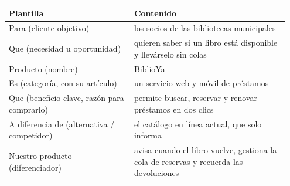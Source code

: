 {\small
\begin{longtable}{@{}>{\raggedright\arraybackslash}p{0.421\linewidth}>{\raggedright\arraybackslash}p{0.528\linewidth}@{}}
\toprule
\textbf{Plantilla} & \textbf{Contenido} \\
\midrule
\endhead
Para (cliente objetivo) & los socios de las bibliotecas municipales \\
Que (necesidad u oportunidad) & quieren saber si un libro está disponible y llevárselo sin colas \\
Producto (nombre) & BiblioYa \\
Es (categoría, con su artículo) & un servicio web y móvil de préstamos \\
Que (beneficio clave, razón para comprarlo) & permite buscar, reservar y renovar préstamos en dos clics \\
A diferencia de (alternativa / competidor) & el catálogo en línea actual, que solo informa \\
Nuestro producto (diferenciador) & avisa cuando el libro vuelve, gestiona la cola de reservas y recuerda las devoluciones \\
\bottomrule
\end{longtable}}
